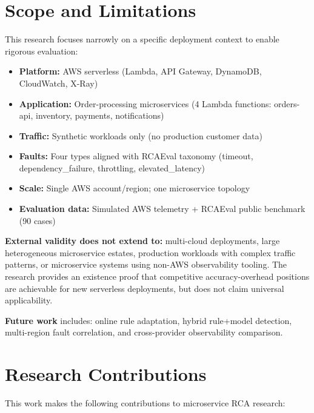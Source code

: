 \section{Scope and Limitations}

This research focuses narrowly on a specific deployment context to enable rigorous evaluation:

\begin{itemize}
    \item \textbf{Platform:} AWS serverless (Lambda, API Gateway, DynamoDB, CloudWatch, X-Ray)
    \item \textbf{Application:} Order-processing microservices (4 Lambda functions: orders-api, inventory, payments, notifications)
    \item \textbf{Traffic:} Synthetic workloads only (no production customer data)
    \item \textbf{Faults:} Four types aligned with RCAEval taxonomy (timeout, dependency\_failure, throttling, elevated\_latency)
    \item \textbf{Scale:} Single AWS account/region; one microservice topology
    \item \textbf{Evaluation data:} Simulated AWS telemetry + RCAEval public benchmark (90 cases)
\end{itemize}

\textbf{External validity does not extend to:} multi-cloud deployments, large heterogeneous microservice estates, production workloads with complex traffic patterns, or microservice systems using non-AWS observability tooling. The research provides an existence proof that competitive accuracy-overhead positions are achievable for new serverless deployments, but does not claim universal applicability.

\textbf{Future work} includes: online rule adaptation, hybrid rule+model detection, multi-region fault correlation, and cross-provider observability comparison.

\section{Research Contributions}

This work makes the following contributions to microservice RCA research:

